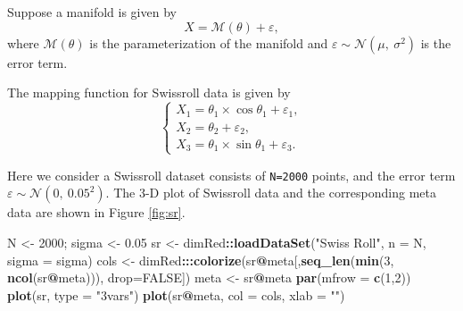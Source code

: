 \documentclass[11pt,a4paper,]{article}
\newenvironment{Shaded}{\begin{snugshade}}{\end{snugshade}}
\newcommand{\DataTypeTok}[1]{\textcolor[rgb]{0.13,0.29,0.53}{#1}}
\newcommand{\DecValTok}[1]{\textcolor[rgb]{0.00,0.00,0.81}{#1}}
\newcommand{\FloatTok}[1]{\textcolor[rgb]{0.00,0.00,0.81}{#1}}
\newcommand{\KeywordTok}[1]{\textcolor[rgb]{0.13,0.29,0.53}{\textbf{#1}}}
\newcommand{\NormalTok}[1]{#1}
\newcommand{\OperatorTok}[1]{\textcolor[rgb]{0.81,0.36,0.00}{\textbf{#1}}}
\newcommand{\OtherTok}[1]{\textcolor[rgb]{0.56,0.35,0.01}{#1}}
\newcommand{\StringTok}[1]{\textcolor[rgb]{0.31,0.60,0.02}{#1}}
\begin{document}
Suppose a manifold is given by
\[
X = \mathcal{M}(\theta) + \varepsilon,
\]
where \(\mathcal{M}(\theta)\) is the parameterization of the manifold and \(\varepsilon \sim \mathcal{N}(\mu, \ \sigma^{2})\) is the error term.

The mapping function for Swissroll data is given by
\[
\left\{ 
\begin{array}{lcl}
X_1 = \theta_1 \times \cos{\theta_1} + \varepsilon_1, \\
X_2 = \theta_2 + \varepsilon_2, \\
X_3 = \theta_1 \times \sin{\theta_1} + \varepsilon_3.
\end{array}
\right.
\]

Here we consider a Swissroll dataset consists of \texttt{N=2000} points, and the error term \(\varepsilon \sim \mathcal{N}(0, \ 0.05^{2})\). The 3-D plot of Swissroll data and the corresponding meta data are shown in Figure \ref{fig:sr}.

\begin{Shaded}
\begin{Highlighting}[]
\NormalTok{N \textless{}{-}}\StringTok{ }\DecValTok{2000}\NormalTok{; sigma \textless{}{-}}\StringTok{ }\FloatTok{0.05}
\NormalTok{sr \textless{}{-}}\StringTok{ }\NormalTok{dimRed}\OperatorTok{::}\KeywordTok{loadDataSet}\NormalTok{(}\StringTok{"Swiss Roll"}\NormalTok{, }\DataTypeTok{n =}\NormalTok{ N, }\DataTypeTok{sigma =}\NormalTok{ sigma)}
\NormalTok{cols \textless{}{-}}\StringTok{ }\NormalTok{dimRed}\OperatorTok{:::}\KeywordTok{colorize}\NormalTok{(sr}\OperatorTok{@}\NormalTok{meta[,}\KeywordTok{seq\_len}\NormalTok{(}\KeywordTok{min}\NormalTok{(}\DecValTok{3}\NormalTok{, }\KeywordTok{ncol}\NormalTok{(sr}\OperatorTok{@}\NormalTok{meta))), }\DataTypeTok{drop=}\OtherTok{FALSE}\NormalTok{])}
\NormalTok{meta \textless{}{-}}\StringTok{ }\NormalTok{sr}\OperatorTok{@}\NormalTok{meta}
\KeywordTok{par}\NormalTok{(}\DataTypeTok{mfrow =} \KeywordTok{c}\NormalTok{(}\DecValTok{1}\NormalTok{,}\DecValTok{2}\NormalTok{))}
\KeywordTok{plot}\NormalTok{(sr, }\DataTypeTok{type =} \StringTok{"3vars"}\NormalTok{)}
\KeywordTok{plot}\NormalTok{(sr}\OperatorTok{@}\NormalTok{meta, }\DataTypeTok{col =}\NormalTok{ cols, }\DataTypeTok{xlab =} \StringTok{""}\NormalTok{)}
\end{Highlighting}
\end{Shaded}
\end{document}
